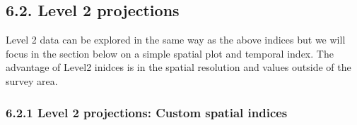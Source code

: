 \documentclass[
]{article}
\begin{document}
\hypertarget{level-2-projections}{%
\subsection{6.2. Level 2 projections}\label{level-2-projections}}

Level 2 data can be explored in the same way as the above indices but we
will focus in the section below on a simple spatial plot and temporal
index. The advantage of Level2 inidces is in the spatial resolution and
values outside of the survey area.

\hypertarget{level-2-projections-custom-spatial-indices}{%
\subsubsection{6.2.1 Level 2 projections: Custom spatial
indices}\label{level-2-projections-custom-spatial-indices}}
\end{document}

